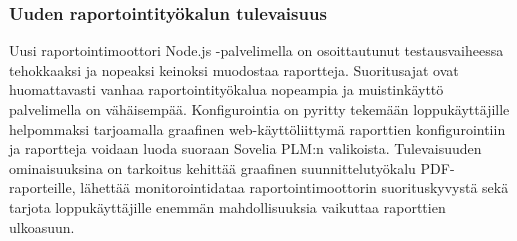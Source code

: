 
\subsubsection{Uuden raportointityökalun tulevaisuus}

Uusi raportointimoottori Node.js -palvelimella on osoittautunut testausvaiheessa tehokkaaksi ja nopeaksi keinoksi muodostaa raportteja. Suoritusajat ovat huomattavasti vanhaa raportointityökalua nopeampia ja muistinkäyttö palvelimella on vähäisempää. Konfigurointia on pyritty tekemään loppukäyttäjille helpommaksi tarjoamalla graafinen web-käyttöliittymä raporttien konfigurointiin ja raportteja voidaan luoda suoraan Sovelia PLM:n valikoista. Tulevaisuuden ominaisuuksina on tarkoitus kehittää graafinen suunnittelutyökalu PDF-raporteille, lähettää monitorointidataa raportointimoottorin suorituskyvystä sekä tarjota loppukäyttäjille enemmän mahdollisuuksia vaikuttaa raporttien ulkoasuun.

